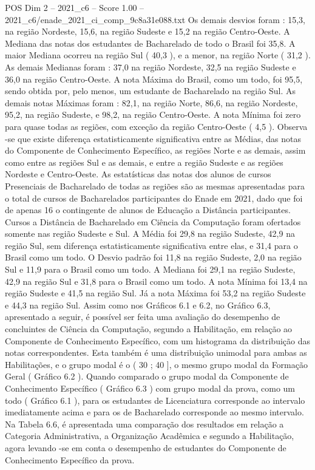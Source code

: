 \begin{textsample}{POS Dim 2 – 2021\_c6 – Score 1.00 – 2021\_c6/enade\_2021\_ci\_comp\_9c8a31e088.txt}
Os demais desvios foram : 15,3, na região Nordeste, 15,6, na região Sudeste e 15,2 na região Centro-Oeste.
A Mediana das notas dos estudantes de Bacharelado de todo o Brasil foi 35,8.
A maior Mediana ocorreu na região Sul ( 40,3 ), e a menor, na região Norte ( 31,2 ).
As demais Medianas foram : 37,0 na região Nordeste, 32,5 na região Sudeste e 36,0 na região Centro-Oeste.
A nota Máxima do Brasil, como um todo, foi 95,5, sendo obtida por, pelo menos, um estudante de Bacharelado na região Sul.
As demais notas Máximas foram : 82,1, na região Norte, 86,6, na região Nordeste, 95,2, na região Sudeste, e 98,2, na região Centro-Oeste.
A nota Mínima foi zero para quase todas as regiões, com exceção da região Centro-Oeste ( 4,5 ).
Observa -se que existe diferença estatisticamente significativa entre as Médias, das notas do Componente de Conhecimento Específico, as regiões Norte e as demais, assim como entre as regiões Sul e as demais, e entre a região Sudeste e as regiões Nordeste e Centro-Oeste.
As estatísticas das notas dos alunos de cursos Presenciais de Bacharelado de todas as regiões são as mesmas apresentadas para o total de cursos de Bacharelados participantes do Enade em 2021, dado que foi de apenas 16 o contingente de alunos de Educação a Distância participantes.
Cursos a Distância de Bacharelado em Ciência da Computação foram ofertados somente nas região Sudeste e Sul.
A Média foi 29,8 na região Sudeste, 42,9 na região Sul, sem diferença estatisticamente significativa entre elas, e 31,4 para o Brasil como um todo.
O Desvio padrão foi 11,8 na região Sudeste, 2,0 na região Sul e 11,9 para o Brasil como um todo.
A Mediana foi 29,1 na região Sudeste, 42,9 na região Sul e 31,8 para o Brasil como um todo.
A nota Mínima foi 13,4 na região Sudeste e 41,5 na região Sul.
Já a nota Máxima foi 53,2 na região Sudeste e 44,3 na região Sul.
Assim como nos Gráficos 6.1 e 6.2, no Gráfico 6.3, apresentado a seguir, é possível ser feita uma avaliação do desempenho de concluintes de Ciência da Computação, segundo a Habilitação, em relação ao Componente de Conhecimento Específico, com um histograma da distribuição das notas correspondentes.
Esta também é uma distribuição unimodal para ambas as Habilitações, e o grupo modal é o ( 30 ; 40 ], o mesmo grupo modal da Formação Geral ( Gráfico 6.2 ).
Quando comparado o grupo modal da Componente de Conhecimento Específico ( Gráfico 6.3 ) com grupo modal da prova, como um todo ( Gráfico 6.1 ), para os estudantes de Licenciatura corresponde ao intervalo imediatamente acima e para os de Bacharelado corresponde ao mesmo intervalo.
Na Tabela 6.6, é apresentada uma comparação dos resultados em relação a Categoria Administrativa, a Organização Acadêmica e segundo a Habilitação, agora levando -se em conta o desempenho de estudantes do Componente de Conhecimento Específico da prova.

\end{textsample}
